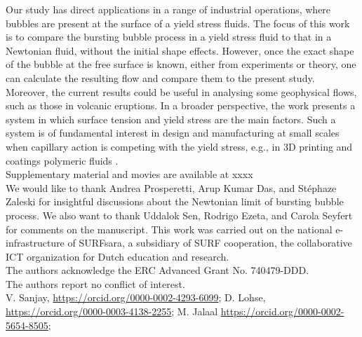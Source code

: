 \documentclass[final]{jfm}
\begin{document}
Our study has direct applications in a range of industrial operations, where bubbles are present at the surface of a yield stress fluids. The focus of this work is to compare the bursting bubble process in a yield stress fluid to that in a Newtonian fluid, without the initial shape effects. However, once the exact shape of the bubble at the free surface is known, either from experiments or theory, one can calculate the resulting flow and compare them to the present study. Moreover, the current results could be useful in analysing some geophysical flows, such as those in volcanic eruptions. In a broader perspective, the work presents a system in which surface tension and yield stress are the main factors. Such a system is of fundamental interest in design and manufacturing at small scales when capillary action is competing with the yield stress, e.g., in 3D printing and coatings polymeric fluids \citep{rauzan2018particle, nelson2019designing, jalaal2019laser, jalaal2021spreading}.\\


 \label{SupMat} Supplementary material and movies are available at xxxx \\

 We would like to thank Andrea Prosperetti, Arup Kumar Das, and Stéphaze Zaleski for insightful discussions about the Newtonian limit of bursting bubble process. We also want to thank Uddalok Sen, Rodrigo Ezeta, and Carola Seyfert for comments on the manuscript. This work was carried out on the national e-infrastructure of SURFsara, a subsidiary of SURF cooperation, the collaborative ICT organization for Dutch education and research.\\

 The authors acknowledge the ERC Advanced Grant No. 740479-DDD.\\

 The  authors report no conflict of interest. \\

 V. Sanjay, \href{https://orcid.org/0000-0002-4293-6099}{https://orcid.org/0000-0002-4293-6099}; D. Lohse, \href{https://orcid.org/0000-0003-4138-2255}{https://orcid.org/0000-0003-4138-2255}; M. Jalaal \href{https://orcid.org/0000-0002-5654-8505}{https://orcid.org/0000-0002-5654-8505};\\

\appendix
\end{document}
